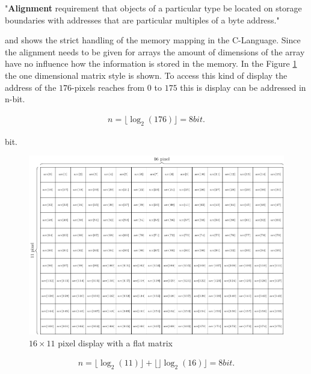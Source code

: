 \begin{displayquote}
	"\textbf{Alignment} requirement that objects of a particular type be located on storage boundaries with addresses that are particular multiples of a byte address."
\end{displayquote}\cite{ISO/IEC9899}

 and shows the strict handling of the memory mapping in the C-Language. Since the alignment needs to be given for arrays the amount of dimensions of the array have no influence how the information is stored in the memory. In the Figure \ref{theory:matrix} the one dimensional matrix style is shown. To access this kind of display the address of the $176$-pixels reaches from $0$ to $175$ this is display can be addressed in n-bit.  
 
 \begin{align}
n = \lfloor \log_{2}(176) \rfloor = 8 bit.
 \end{align}

 bit.   

\begin{figure}[H]
	\centering
	\includegraphics[width=1\textwidth]{2-theory/drawing-graphics/graphics/matrix.pdf}
	\caption{$16\times 11$ pixel display with a flat matrix \label{theory:matrix}}
\end{figure}

 \begin{align}
n = \lfloor \log_{2}(11) \rfloor + \lfloor\rfloor\log_{2}(16) \rfloor = 8 bit.
\end{align}

